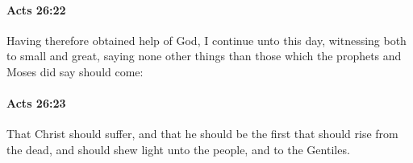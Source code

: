 		\paragraph{Acts 26:22} %
			\label{ACTS-26-22}

			Having therefore obtained help of God, I continue unto this day, witnessing both to small and great, saying none other things than those which the prophets and Moses did say should come:

			\begin{framed}
			\scriptsize
				\begin{compactdesc}
					\item[SBLG] 
				\end{compactdesc}
			\end{framed}

		\paragraph{Acts 26:23} %
			\label{ACTS-26-23}

			That Christ should suffer, and that he should be the first that should rise from the dead, and should shew light unto the people, and to the Gentiles.

